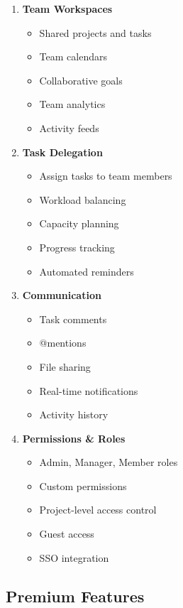 \begin{enumerate}
    \item \textbf{Team Workspaces}
    \begin{itemize}
        \item Shared projects and tasks
        \item Team calendars
        \item Collaborative goals
        \item Team analytics
        \item Activity feeds
    \end{itemize}
    
    \item \textbf{Task Delegation}
    \begin{itemize}
        \item Assign tasks to team members
        \item Workload balancing
        \item Capacity planning
        \item Progress tracking
        \item Automated reminders
    \end{itemize}
    
    \item \textbf{Communication}
    \begin{itemize}
        \item Task comments
        \item @mentions
        \item File sharing
        \item Real-time notifications
        \item Activity history
    \end{itemize}
    
    \item \textbf{Permissions \& Roles}
    \begin{itemize}
        \item Admin, Manager, Member roles
        \item Custom permissions
        \item Project-level access control
        \item Guest access
        \item SSO integration
    \end{itemize}
\end{enumerate}

\subsection{Premium Features}

